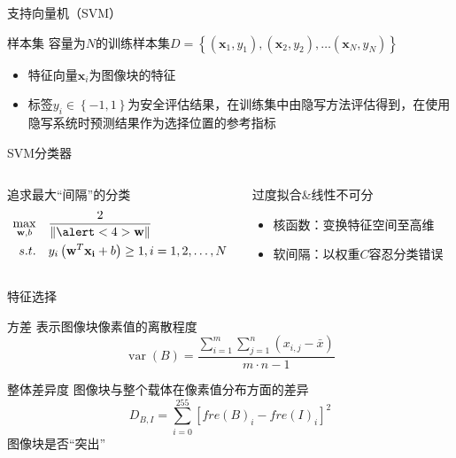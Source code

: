 \documentclass[14pt]{Bredelebeamer}
\begin{document}
\begin{frame}{支持向量机（SVM）}
	\begin{block}{样本集}
		容量为$N$的训练样本集$D = \left\{ {\left( {{{\mathbf{x}}_1},{y_1}} \right),\left( {{{\mathbf{x}}_2},{y_2}} \right), \ldots \left( {{{\mathbf{x}}_N},{y_N}} \right)} \right\}$
    \pause
		\begin{itemize}
			\item 特征向量${\mathbf{x}_i}$为图像块的特征
      \pause
			\item 标签$y_i \in \left\{ -1,1\right\}$为安全评估结果，在训练集中由隐写方法评估得到，在使用隐写系统时预测结果作为选择位置的参考指标
		\end{itemize}
	\end{block}
\pause
	\begin{alertblock}{SVM分类器}
			\begin{columns}
			\begin{column}{.5\textwidth}
		追求最大\alert<4>{“间隔”}的分类
		$$
		\begin{aligned}
		\mathop {\max }\limits_{{\mathbf{w}},b} & \quad\frac{2}{{\left\| {\alert<4>{\mathbf{w}}} \right\|}} \\
		s.t. &\quad {y_i}  \left( {{{\mathbf{w}}^T}{\mathbf{x_i}} + b} \right) \ge 1,i = 1,2, \ldots ,N
		\end{aligned}$$
			\end{column}
      \pause
					\begin{column}{.41\textwidth}
						过度拟合\&线性不可分
						\begin{itemize}
              \pause
							\item 核函数：变换特征空间至高维
              \pause
							\item 软间隔：以权重$C$容忍分类错误
						\end{itemize}
						\end{column}
		\end{columns}
	\end{alertblock}
\end{frame}

\begin{frame}{特征选择}
  \pause
	\begin{exampleblock}{方差}
		表示图像块像素值的离散程度
		$${\mathop{var}} \left( B \right) = \frac{{\sum\limits_{i = 1}^m {\sum\limits_{j = 1}^n {\left( {{x_{i,j}} - \bar x} \right)} } }}{{m \cdot n - 1}}$$
	\end{exampleblock}

\pause
	\begin{alertblock}{整体差异度}
		图像块与整个载体在像素值分布方面的差异
		$${D_{B,I}} =\sum\limits_{i = 0}^{255} {{{\left[ {fre{{\left( B \right)}_i} - fre{{\left( I \right)}_i}} \right]}^2}}$$
		图像块是否\alert{“突出”}
	\end{alertblock}
\end{frame}
\end{document}
